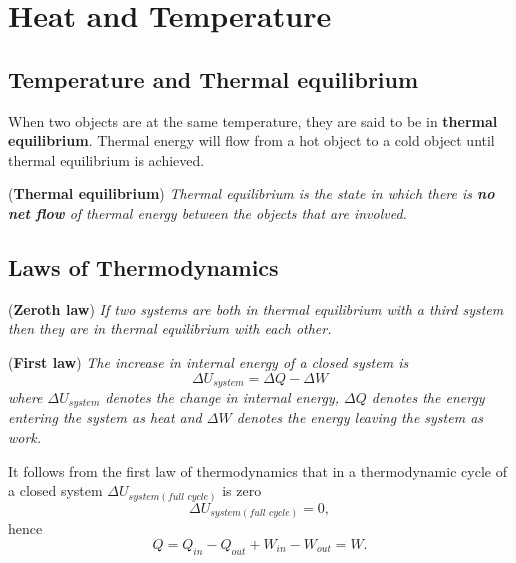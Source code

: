 \section{Heat and Temperature}

\subsection{Temperature and Thermal equilibrium}
When two objects are at the same temperature, they are said to be in \textbf{thermal equilibrium}. Thermal energy will flow from a hot object to a cold object until thermal equilibrium is achieved. 

\begin{definition}{(\textbf{Thermal equilibrium})}
\textit{Thermal equilibrium is the state in which there is \textbf{no net flow} of thermal energy between the objects that are involved.}
\end{definition}

\subsection{Laws of Thermodynamics}

\begin{theorem}{(\textbf{Zeroth law})}
\textit{If two systems are both in thermal equilibrium with a third system then they are in thermal equilibrium with each other.}
\end{theorem}

\begin{theorem}{(\textbf{First law})}
\textit{The increase in internal energy of a closed system is }
\begin{equation}
    \Delta U_{system} = \Delta Q - \Delta W
\end{equation}
\textit{where $\Delta U_{system}$ denotes the change in internal energy, $\Delta Q$ denotes the energy entering the system as heat and $\Delta W$ denotes the energy leaving the system as work.}
\end{theorem}
It follows from the first law of thermodynamics that in a thermodynamic cycle of a closed system $\Delta U_{system(\textit{full cycle})}$ is zero
\begin{equation}
    \Delta U_{system(\textit{full cycle})} = 0,
\end{equation}
hence 
\begin{equation}
    Q = Q_{in} - Q_{out} + W_{in} - W_{out} = W.
\end{equation}

